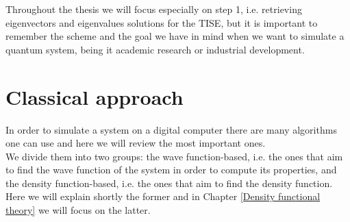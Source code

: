 Throughout the thesis we will focus especially on step 1, i.e. retrieving eigenvectors and eigenvalues solutions for the TISE, but it is important to remember the scheme and the goal we have in mind when we want to simulate a quantum system, being it academic research or industrial development.

\section{Classical approach}
In order to simulate a system on a digital computer there are many algorithms one can use and here we will review the most important ones. \\
We divide them into two groups: the wave function-based, i.e. the ones that aim to find the wave function of the system in order to compute its properties, and the density function-based, i.e. the ones that aim to find the density function. Here we will explain shortly the former and in Chapter \ref{Density functional theory} we will focus on the latter. \\

